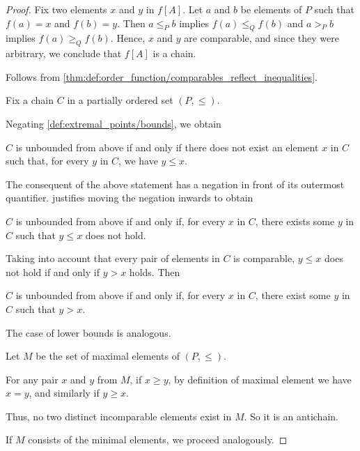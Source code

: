 \begin{proof}
   Fix two elements \( x \) and \( y \) in \( f[A] \). Let \( a \) and \( b \) be elements of \( P \) such that \( f(a) = x \) and \( f(b) = y \). Then \( a \leq_P b \) implies \( f(a) \leq_Q f(b) \) and \( a >_P b \) implies \( f(a) \geq_Q f(b) \). Hence, \( x \) and \( y \) are comparable, and since they were arbitrary, we conclude that \( f[A] \) is a chain.

   Follows from \cref{thm:def:order_function/comparables_reflect_inequalities}.

   Fix a chain \( C \) in a partially ordered set \( (P, \leq) \).

  Negating \cref{def:extremal_points/bounds}, we obtain
  \begin{displayquote}
    \( C \) is unbounded from above if and only if there does not exist an element \( x \) in \( C \) such that, for every \( y \) in \( C \), we have \( y \leq x \).
  \end{displayquote}

  The consequent of the above statement has a negation in front of its outermost quantifier.  justifies moving the negation inwards to obtain
  \begin{displayquote}
    \( C \) is unbounded from above if and only if, for every \( x \) in \( C \), there exists some \( y \) in \( C \) such that \( y \leq x \) does not hold.
  \end{displayquote}

  Taking into account that every pair of elements in \( C \) is comparable, \( y \leq x \) does not hold if and only if \( y > x \) holds. Then
  \begin{displayquote}
    \( C \) is unbounded from above if and only if, for every \( x \) in \( C \), there exist some \( y \) in \( C \) such that \( y > x \).
  \end{displayquote}

  The case of lower bounds is analogous.

   Let \( M \) be the set of maximal elements of \( (P, \leq) \).

  For any pair \( x \) and \( y \) from \( M \), if \( x \geq y \), by definition of maximal element we have \( x = y \), and similarly if \( y \geq x \).

  Thus, no two distinct incomparable elements exist in \( M \). So it is an antichain.

  If \( M \) consists of the minimal elements, we proceed analogously.
\end{proof}

